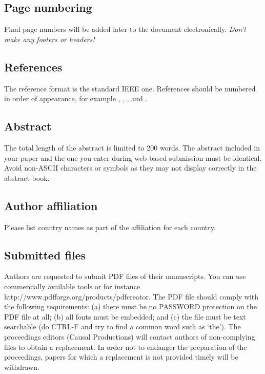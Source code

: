 \documentclass[a4paper]{article}
\begin{document}
\subsection{Page numbering}

Final page numbers will be added later to the document electronically. \emph{Don't make any footers or headers!}


\subsection{References}

The reference format is the standard IEEE one. References should be numbered in order of appearance, for example \cite{Davis80-COP}, \cite{Rabiner89-ATO}, \cite[pp.\ 417--422]{Hastie09-TEO}, and \cite{YourName17-XXX}.

\subsection{Abstract}

The total length of the abstract is limited to 200 words. The abstract included in your paper and the one you enter during web-based submission must be identical. Avoid non-ASCII characters or symbols as they may not display correctly in the abstract book.

\subsection{Author affiliation}

Please list country names as part of the affiliation for each country.

\subsection{Submitted files}

Authors are requested to submit PDF files of their manu­scripts. You can use commercially available tools or for instance http://www.pdfforge.org/products/pdfcreator. The PDF file should comply with the following requirements: (a) there must be no PASSWORD protection on the PDF file at all; (b) all fonts must be embedded; and (c) the file must be text searchable (do CTRL-F and try to find a common word such as ‘the’). The proceedings editors (Causal Productions) will contact authors of non-complying files to obtain a replacement. In order not to endanger the preparation of the proceedings, papers for which a replacement is not provided timely will be withdrawn.
\end{document}

